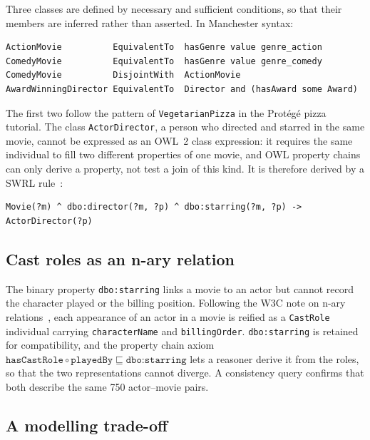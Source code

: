 \documentclass[11pt,a4paper]{article}
\newcommand{\code}[1]{\texttt{#1}}
\begin{document}
Three classes are defined by necessary and sufficient conditions, so that their members are inferred rather than asserted. In Manchester syntax:
\par\noindent\begin{minipage}{\linewidth}\begin{lstlisting}
ActionMovie          EquivalentTo  hasGenre value genre_action
ComedyMovie          EquivalentTo  hasGenre value genre_comedy
ComedyMovie          DisjointWith  ActionMovie
AwardWinningDirector EquivalentTo  Director and (hasAward some Award)
\end{lstlisting}\end{minipage}\par
The first two follow the pattern of \code{VegetarianPizza} in the Protégé pizza tutorial. The class \code{ActorDirector}, a person who directed and starred in the same movie, cannot be expressed as an OWL~2 class expression: it requires the same individual to fill two different properties of one movie, and OWL property chains can only derive a property, not test a join of this kind. It is therefore derived by a SWRL rule~\cite{swrl}:
\par\noindent\begin{minipage}{\linewidth}\begin{lstlisting}
Movie(?m) ^ dbo:director(?m, ?p) ^ dbo:starring(?m, ?p) -> ActorDirector(?p)
\end{lstlisting}\end{minipage}\par

\subsection{Cast roles as an n-ary relation}

The binary property \code{dbo:starring} links a movie to an actor but cannot record the character played or the billing position. Following the W3C note on n-ary relations~\cite{naryrel}, each appearance of an actor in a movie is reified as a \code{CastRole} individual carrying \code{characterName} and \code{billingOrder}. \code{dbo:starring} is retained for compatibility, and the property chain axiom $\code{hasCastRole} \circ \code{playedBy} \sqsubseteq \code{dbo:starring}$ lets a reasoner derive it from the roles, so that the two representations cannot diverge. A consistency query confirms that both describe the same 750 actor--movie pairs.

\subsection{A modelling trade-off}
\end{document}
